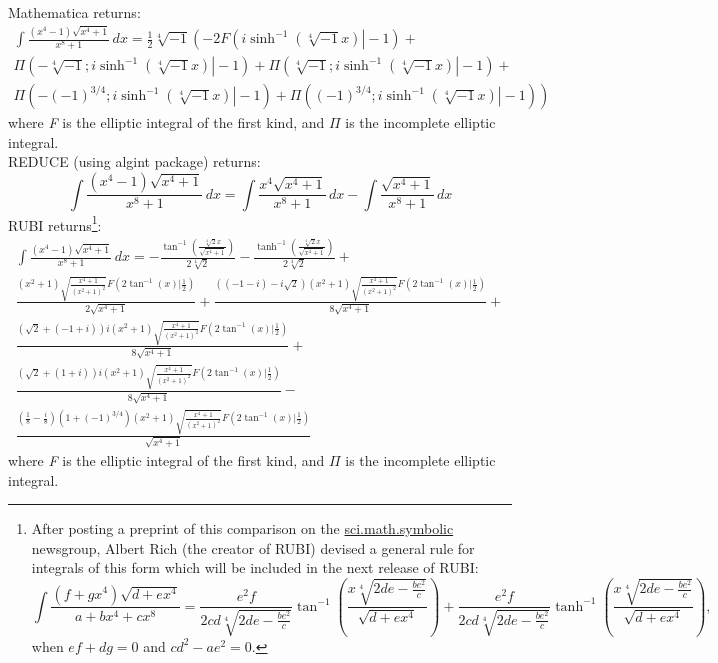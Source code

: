 \documentclass[12pt]{article}
\numberwithin{equation}{section}
\theoremstyle{definition}
\begin{document}
\normalsize
Mathematica returns:
\small
\begin{multline*}
\int \frac{\left(x^4-1\right) \sqrt{x^4+1}}{x^8+1} \, dx = \frac{1}{2} \sqrt[4]{-1} \left(-2 F\left(\left.i \sinh ^{-1}\left(\sqrt[4]{-1} x\right)\right|-1\right) \right. + \\
\Pi\left(-\sqrt[4]{-1};\left.i \sinh ^{-1}\left(\sqrt[4]{-1} x\right)\right|-1\right) + 
\Pi \left(\sqrt[4]{-1};\left.i \sinh ^{-1}\left(\sqrt[4]{-1} x\right)\right|-1\right) + \\
\left. \Pi\left(-(-1)^{3/4};\left.i \sinh ^{-1}\left(\sqrt[4]{-1} x\right)\right|-1\right)+\Pi \left((-1)^{3/4};\left.i \sinh ^{-1}\left(\sqrt[4]{-1} x\right)\right|-1\right)\right)
\end{multline*}
\normalsize
where \textit{F} is the elliptic integral of the first kind, and $\Pi$ is the incomplete elliptic integral. \\

\noindent REDUCE (using algint package) returns:
\small
$$\int \frac{\left(x^4-1\right) \sqrt{x^4+1}}{x^8+1} \, dx = 
\int \frac{x^4 \sqrt{x^4+1}}{x^8+1} \, dx-\int \frac{\sqrt{x^4+1}}{x^8+1} \, dx$$
\normalsize
RUBI returns\footnote{After posting a preprint of this comparison on the 
\href{https://groups.google.com/forum/\#!forum/sci.math.symbolic}{sci.math.symbolic}
newsgroup, Albert Rich (the creator of RUBI) devised a general rule for integrals of this 
form which will be included in the next release of RUBI: %
$$\int\frac{\left(f+g x^4\right)\sqrt{d+e x^4}}{a+b x^4+c x^8} = 
\frac{e^2 f}{2 c d \sqrt[4]{2 d e-\frac{b e^2}{c}}} \tan ^{-1}\left(\frac{x \sqrt[4]{2 d e-\frac{b e^2}{c}}}{\sqrt{d+e x^4}}\right) 
	+\frac{e^2 f}{2 c d \sqrt[4]{2 d e-\frac{b e^2}{c}}} \tanh ^{-1}\left(\frac{x \sqrt[4]{2 d e-\frac{be^2}{c}}}{\sqrt{d+e x^4}}\right),$$ when $e f+d g=0$ and $c d^2-a e^2=0$.}:
\small
\begin{multline*}
\int \frac{\left(x^4-1\right) \sqrt{x^4+1}}{x^8+1} \, dx=
-\frac{\tan ^{-1}\left(\frac{\sqrt[4]{2} x}{\sqrt{x^4+1}}\right)}{2 \sqrt[4]{2}}-
\frac{\tanh^{-1}\left(\frac{\sqrt[4]{2} x}{\sqrt{x^4+1}}\right)}{2 \sqrt[4]{2}} + \\
\frac{\left(x^2+1\right) \sqrt{\frac{x^4+1}{\left(x^2+1\right)^2}} F\left(2\tan ^{-1}(x)|\frac{1}{2}\right)}{2 \sqrt{x^4+1}} + 
\frac{\left((-1-i)-i \sqrt{2}\right) \left(x^2+1\right) \sqrt{\frac{x^4+1}{\left(x^2+1\right)^2}}
F\left(2 \tan ^{-1}(x)|\frac{1}{2}\right)}{8 \sqrt{x^4+1}} + \\
\frac{\left(\sqrt{2}+(-1+i)\right) i \left(x^2+1\right) \sqrt{\frac{x^4+1}{\left(x^2+1\right)^2}}
F\left(2 \tan ^{-1}(x)|\frac{1}{2}\right)}{8 \sqrt{x^4+1}} + \\
\frac{\left(\sqrt{2}+(1+i)\right) i \left(x^2+1\right) \sqrt{\frac{x^4+1}{\left(x^2+1\right)^2}}
F\left(2 \tan ^{-1}(x)|\frac{1}{2}\right)}{8 \sqrt{x^4+1}} - \\
\frac{\left(\frac{1}{8}-\frac{i}{8}\right) \left(1+(-1)^{3/4}\right) \left(x^2+1\right)
\sqrt{\frac{x^4+1}{\left(x^2+1\right)^2}} F\left(2 \tan ^{-1}(x)|\frac{1}{2}\right)}{\sqrt{x^4+1}}
\end{multline*}
\normalsize
where \textit{F} is the elliptic integral of the first kind, and $\Pi$ is the incomplete elliptic integral. \\
\end{document}
